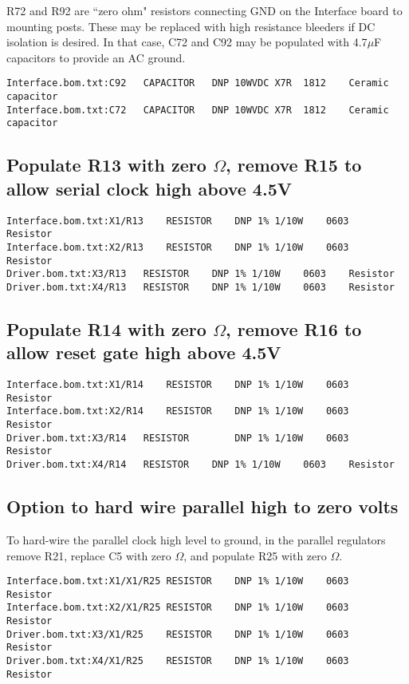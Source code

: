 \documentclass[11pt]{article}
\begin{document}
R72 and R92 are ``zero ohm" resistors connecting GND on the Interface board to mounting posts. These may be replaced with high resistance bleeders if DC isolation is desired. In that case, C72 and C92 may be populated with 4.7$\mu$F capacitors to provide an AC ground.

\begin{verbatim}
Interface.bom.txt:C92	CAPACITOR	DNP	10WVDC X7R	1812	Ceramic capacitor	
Interface.bom.txt:C72	CAPACITOR	DNP	10WVDC X7R	1812	Ceramic capacitor	
 \end{verbatim}

\subsection{Populate R13 with zero $\Omega$, remove R15 to allow serial clock high above 4.5V}
\begin{verbatim}
Interface.bom.txt:X1/R13	RESISTOR	DNP	1% 1/10W	0603	Resistor	
Interface.bom.txt:X2/R13	RESISTOR	DNP	1% 1/10W	0603	Resistor	
Driver.bom.txt:X3/R13	RESISTOR	DNP	1% 1/10W	0603	Resistor	
Driver.bom.txt:X4/R13	RESISTOR	DNP	1% 1/10W	0603	Resistor	
\end{verbatim}

\subsection{Populate R14 with zero $\Omega$, remove R16 to allow reset gate high above 4.5V}
\begin{verbatim}
Interface.bom.txt:X1/R14	RESISTOR	DNP	1% 1/10W	0603	Resistor	
Interface.bom.txt:X2/R14	RESISTOR	DNP	1% 1/10W	0603	Resistor	
Driver.bom.txt:X3/R14	RESISTOR		DNP	1% 1/10W	0603	Resistor	
Driver.bom.txt:X4/R14	RESISTOR	DNP	1% 1/10W	0603	Resistor	
\end{verbatim}
\subsection{Option to hard wire parallel high to zero volts}

To hard-wire the parallel clock high level to ground, in the parallel regulators
remove R21,
replace C5 with zero $\Omega$, and
populate R25 with zero $\Omega$.

\begin{verbatim}
Interface.bom.txt:X1/X1/R25	RESISTOR	DNP	1% 1/10W	0603	Resistor	
Interface.bom.txt:X2/X1/R25	RESISTOR	DNP	1% 1/10W	0603	Resistor	
Driver.bom.txt:X3/X1/R25	RESISTOR	DNP	1% 1/10W	0603	Resistor	
Driver.bom.txt:X4/X1/R25	RESISTOR	DNP	1% 1/10W	0603	Resistor	
\end{verbatim}
\end{document}
